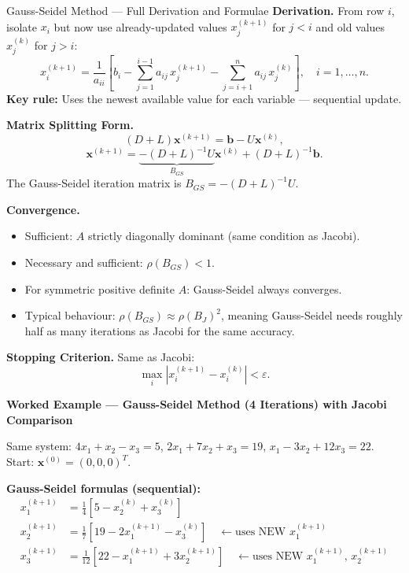 \documentclass[12pt,a4paper]{article}
\begin{document}
\begin{infobox}{Gauss-Seidel Method --- Full Derivation and Formulae}
\textbf{Derivation.} From row \(i\), isolate \(x_i\) but now use already-updated
values \(x_j^{(k+1)}\) for \(j < i\) and old values \(x_j^{(k)}\) for \(j > i\):
\[
  x_i^{(k+1)} = \frac{1}{a_{ii}}\!\left[
    b_i - \sum_{j=1}^{i-1} a_{ij}\,x_j^{(k+1)} - \sum_{j=i+1}^{n} a_{ij}\,x_j^{(k)}
  \right], \quad i = 1,\ldots,n.
\]
\textbf{Key rule:} Uses the newest available value for each variable --- sequential update.

\textbf{Matrix Splitting Form.}
\[
  (D+L)\mathbf{x}^{(k+1)} = \mathbf{b} - U\mathbf{x}^{(k)},
\]
\[
  \mathbf{x}^{(k+1)} = \underbrace{-(D+L)^{-1}U}_{B_{GS}}\mathbf{x}^{(k)} + (D+L)^{-1}\mathbf{b}.
\]
The Gauss-Seidel iteration matrix is \(B_{GS} = -(D+L)^{-1}U\).

\textbf{Convergence.}
\begin{itemize}
  \item Sufficient: \(A\) strictly diagonally dominant (same condition as Jacobi).
  \item Necessary and sufficient: \(\rho(B_{GS}) < 1\).
  \item For symmetric positive definite \(A\): Gauss-Seidel always converges.
  \item Typical behaviour: \(\rho(B_{GS}) \approx \rho(B_J)^2\), meaning Gauss-Seidel
        needs roughly half as many iterations as Jacobi for the same accuracy.
\end{itemize}

\textbf{Stopping Criterion.} Same as Jacobi:
\[
  \max_{i}\left|x_i^{(k+1)} - x_i^{(k)}\right| < \varepsilon.
\]
\end{infobox}

\textbf{Worked Example --- Gauss-Seidel Method (4 Iterations) with Jacobi Comparison}

Same system: \(4x_1+x_2-x_3=5\), \(2x_1+7x_2+x_3=19\), \(x_1-3x_2+12x_3=22\).
Start: \(\mathbf{x}^{(0)}=(0,0,0)^T\).

\textbf{Gauss-Seidel formulas (sequential):}
\begin{align*}
x_1^{(k+1)} &= \tfrac{1}{4}\!\left[5 - x_2^{(k)} + x_3^{(k)}\right] \\
x_2^{(k+1)} &= \tfrac{1}{7}\!\left[19 - 2x_1^{(k+1)} - x_3^{(k)}\right]
  \quad\leftarrow\text{uses NEW }x_1^{(k+1)}\\
x_3^{(k+1)} &= \tfrac{1}{12}\!\left[22 - x_1^{(k+1)} + 3x_2^{(k+1)}\right]
  \quad\leftarrow\text{uses NEW }x_1^{(k+1)},\,x_2^{(k+1)}
\end{align*}
\end{document}
